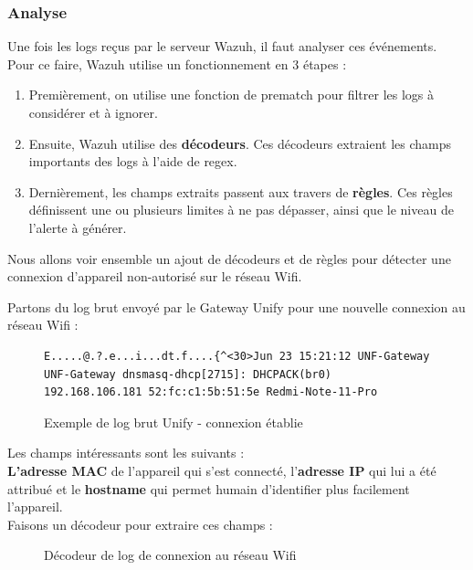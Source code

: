 \documentclass[a4paper, 11pt]{article}
\begin{document}
\subsubsection{Analyse}

Une fois les logs reçus par le serveur Wazuh, il faut analyser ces événements. Pour ce faire, Wazuh utilise un fonctionnement en 3 étapes :

\begin{enumerate}
  \item[$\bullet$] Premièrement, on utilise une fonction de prematch pour filtrer les logs à considérer et à ignorer.
  \item[$\bullet$] Ensuite, Wazuh utilise des \textbf{décodeurs}. Ces décodeurs extraient les champs importants des logs à l'aide de regex.
  \item[$\bullet$] Dernièrement, les champs extraits passent aux travers de \textbf{règles}. Ces règles définissent une ou plusieurs limites à ne pas dépasser, ainsi que le niveau de l'alerte à générer.
\end{enumerate}

Nous allons voir ensemble un ajout de décodeurs et de règles pour détecter une connexion d'appareil non-autorisé sur le réseau Wifi.
\par\bigskip

Partons du log brut envoyé par le Gateway Unify pour une nouvelle connexion au réseau Wifi :\\
\begin{figure}[H]
  \centering
  \begin{minipage}{1\textwidth}
\begin{lstlisting}[]
E.....@.?.e...i...dt.f....{^<30>Jun 23 15:21:12 UNF-Gateway UNF-Gateway dnsmasq-dhcp[2715]: DHCPACK(br0) 192.168.106.181 52:fc:c1:5b:51:5e Redmi-Note-11-Pro
\end{lstlisting}
  \label{fig:raw-log}
  \caption{Exemple de log brut Unify - connexion établie}
  \end{minipage}
\end{figure}

Les champs intéressants sont les suivants :\\
\textbf{L'adresse MAC} de l'appareil qui s'est connecté, l'\textbf{adresse IP} qui lui a été attribué et le \textbf{hostname} qui permet humain d'identifier plus facilement l'appareil.\\
Faisons un décodeur pour extraire ces champs :

\begin{figure}[H]
  
  \label{fig:unf-decoder}
  \caption{Décodeur de log de connexion au réseau Wifi}
\end{figure}
\par\bigskip
\end{document}
